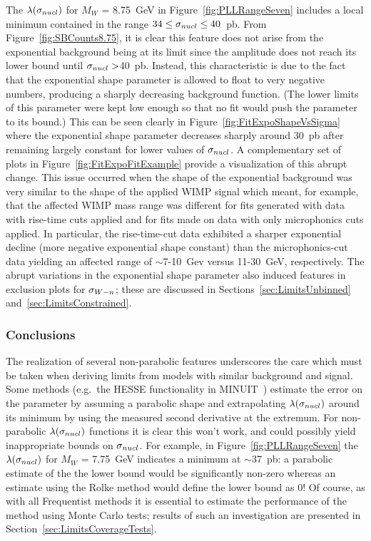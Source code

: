 The $\lambda(\sigma_{nucl})$ for $M_{W}$ = 8.75~GeV in Figure~\ref{fig:PLLRangeSeven} includes a local minimum contained in the range $34\leq\sigma_{nucl}\leq40$~pb.  From Figure~\ref{fig:SBCounts8.75}, it is clear this feature does not arise from the exponential background being at its limit since the amplitude does not reach its lower bound until $\sigma_{nucl}>$40~pb.  Instead, this characteristic is due to the fact that the exponential shape parameter is allowed to float to very negative numbers, producing a sharply decreasing background function.  (The lower limits of this parameter were kept low enough so that no fit would push the parameter to its bound.)  This can be seen clearly in Figure~\ref{fig:FitExpoShapeVsSigma} where the exponential shape parameter decreases sharply around 30~pb after remaining largely constant for lower values of $\sigma_{nucl}$.  A complementary set of plots in Figure~\ref{fig:FitExpoFitExample} provide a visualization of this abrupt change.  This issue occurred when the shape of the exponential background was very similar to the shape of the applied WIMP signal which meant, for example, that the affected WIMP mass range was different for fits generated with data with rise-time cuts applied and for fits made on data with only microphonics cuts applied.  In particular, the rise-time-cut data exhibited a sharper exponential decline (more negative exponential shape constant) than the microphonics-cut data yielding an affected range of $\sim$7-10~Gev versus 11-30~GeV, respectively.  The abrupt variations in the exponential shape parameter also induced features in exclusion plots for $\sigma_{W-n}$; these are discussed in Sections~\ref{sec:LimitsUnbinned} and~\ref{sec:LimitsConstrained}.

		\subsubsection{Conclusions}
		\label{sec:LLPathoConclusions}

The realization of several non-parabolic features underscores the care which must be taken when deriving limits from models with similar background and signal.  Some methods (e.g.~the HESSE functionality in MINUIT~\cite{James:1975dr}) estimate the error on the parameter by assuming a parabolic shape and extrapolating $\lambda(\sigma_{nucl})$ around its minimum by using the measured second derivative at the extremum.  For non-parabolic $\lambda(\sigma_{nucl})$ functions it is clear this won't work, and could possibly yield inappropriate bounds on $\sigma_{nucl}$.  For example, in Figure~\ref{fig:PLLRangeSeven} the $\lambda(\sigma_{nucl})$ for $M_{W}$ = 7.75~GeV indicates a minimum at $\sim$37~pb: a parabolic estimate of the the lower bound would be significantly non-zero %
whereas an estimate using the Rolke method would define the lower bound as 0!  Of course, as with all Frequentist methods it is essential to estimate the performance of the method using Monte Carlo tests; results of such an investigation are presented in Section~\ref{sec:LimitsCoverageTests}.


